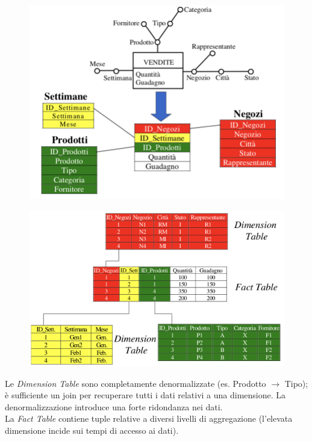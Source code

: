 \documentclass[a4paper, notitlepage, 9pt]{extreport}
\begin{document}
\begin{multicols}{2}
\begin{figure}[H]
	\centering
	\includegraphics[scale=0.38]{Stella}
\end{figure}
\columnbreak
\begin{figure}[H]
	\centering
	\includegraphics[scale=0.38]{Stella2}
\end{figure}
\end{multicols}
\noindent
Le \textit{Dimension Table} sono completamente denormalizzate (es. Prodotto $\rightarrow$ Tipo); è sufficiente un join per recuperare tutti i dati relativi a una dimensione. La denormalizzazione introduce una forte ridondanza nei
dati.\\
La \textit{Fact Table} contiene tuple relative a diversi livelli di aggregazione (l'elevata dimensione incide sui tempi di accesso ai dati).
\end{document}
